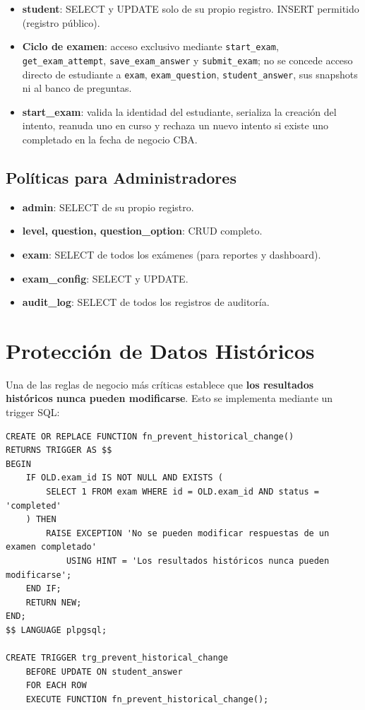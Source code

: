 \begin{itemize}
    \item \textbf{student}: SELECT y UPDATE solo de su propio registro. INSERT permitido (registro público).
    \item \textbf{Ciclo de examen}: acceso exclusivo mediante \texttt{start\_exam}, \texttt{get\_exam\_attempt}, \texttt{save\_exam\_answer} y \texttt{submit\_exam}; no se concede acceso directo de estudiante a \texttt{exam}, \texttt{exam\_question}, \texttt{student\_answer}, sus snapshots ni al banco de preguntas.
    \item \textbf{start\_exam}: valida la identidad del estudiante, serializa la creación del intento, reanuda uno en curso y rechaza un nuevo intento si existe uno completado en la fecha de negocio CBA.
\end{itemize}

\subsection{Políticas para Administradores}

\begin{itemize}
    \item \textbf{admin}: SELECT de su propio registro.
    \item \textbf{level, question, question\_option}: CRUD completo.
    \item \textbf{exam}: SELECT de todos los exámenes (para reportes y dashboard).
    \item \textbf{exam\_config}: SELECT y UPDATE.
    \item \textbf{audit\_log}: SELECT de todos los registros de auditoría.
\end{itemize}

\section{Protección de Datos Históricos}

Una de las reglas de negocio más críticas establece que \textbf{los resultados históricos nunca pueden modificarse}. Esto se implementa mediante un trigger SQL:

\begin{lstlisting}[language=PostgreSQL, caption=Trigger de protección de históricos]
CREATE OR REPLACE FUNCTION fn_prevent_historical_change()
RETURNS TRIGGER AS $$
BEGIN
    IF OLD.exam_id IS NOT NULL AND EXISTS (
        SELECT 1 FROM exam WHERE id = OLD.exam_id AND status = 'completed'
    ) THEN
        RAISE EXCEPTION 'No se pueden modificar respuestas de un examen completado'
            USING HINT = 'Los resultados históricos nunca pueden modificarse';
    END IF;
    RETURN NEW;
END;
$$ LANGUAGE plpgsql;

CREATE TRIGGER trg_prevent_historical_change
    BEFORE UPDATE ON student_answer
    FOR EACH ROW
    EXECUTE FUNCTION fn_prevent_historical_change();
\end{lstlisting}

